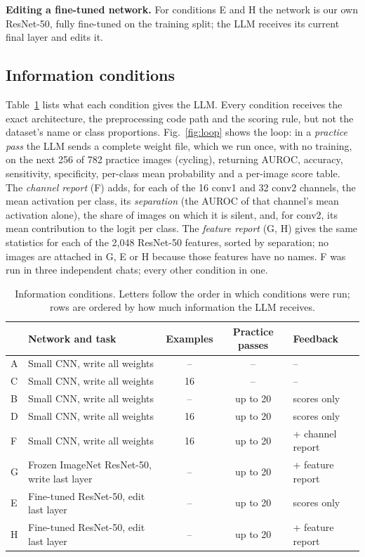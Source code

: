 \documentclass[runningheads]{llncs}
\begin{document}
\noindent\textbf{Editing a fine-tuned network.}
For conditions E and H the network is our own ResNet-50, fully fine-tuned on the training split; the LLM receives its current final layer and edits it.

\subsection{Information conditions}
Table~\ref{tab:conds} lists what each condition gives the LLM.
Every condition receives the exact architecture, the preprocessing code path and the scoring rule, but not the dataset's name or class proportions.
Fig.~\ref{fig:loop} shows the loop: in a \emph{practice pass} the LLM sends a complete weight file, which we run once, with no training, on the next 256 of 782 practice images (cycling), returning AUROC, accuracy, sensitivity, specificity, per-class mean probability and a per-image score table.
The \emph{channel report} (F) adds, for each of the 16 conv1 and 32 conv2 channels, the mean activation per class, its \emph{separation} (the AUROC of that channel's mean activation alone), the share of images on which it is silent, and, for conv2, its mean contribution to the logit per class.
The \emph{feature report} (G, H) gives the same statistics for each of the 2,048 ResNet-50 features, sorted by separation; no images are attached in G, E or H because those features have no names.
F was run in three independent chats; every other condition in one.

\begin{table}[t]
\centering
\caption{Information conditions. Letters follow the order in which conditions were run; rows are ordered by how much information the LLM receives.}
\label{tab:conds}
\setlength{\tabcolsep}{2.5pt}
\scriptsize
\begin{tabular}{@{}llccl@{}}
\toprule
 & Network and task & Examples & Practice passes & Feedback \\
\midrule
A & Small CNN, write all weights & -- & -- & -- \\
C & Small CNN, write all weights & 16 & -- & -- \\
B & Small CNN, write all weights & -- & up to 20 & scores only \\
D & Small CNN, write all weights & 16 & up to 20 & scores only \\
F & Small CNN, write all weights & 16 & up to 20 & + channel report \\
\midrule
G & Frozen ImageNet ResNet-50, write last layer & -- & up to 20 & + feature report \\
E & Fine-tuned ResNet-50, edit last layer & -- & up to 20 & scores only \\
H & Fine-tuned ResNet-50, edit last layer & -- & up to 20 & + feature report \\
\bottomrule
\end{tabular}
\end{table}
\end{document}
